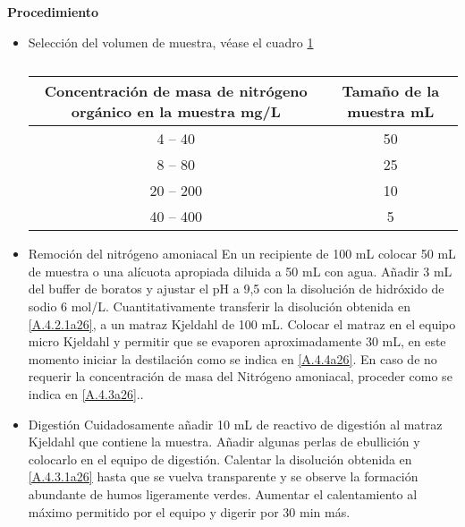 \Large{\textbf{Procedimiento}}
\normalsize

\begin{itemize}
	\item Selección del volumen de muestra, véase el cuadro \ref{tab:A1a26} \label{A.4.1a26}
	\begin{table}[!h]
		\centering
		\caption{}
		\label{tab:A1a26}
		\begin{tabular}{|c|c|}
			\hline
			\rowcolor[HTML]{C0C0C0} 
			Concentración de masa de nitrógeno orgánico en la muestra mg/L & Tamaño de la muestra mL \\ \hline
			4 -- 40                                                        & 50                      \\ \hline
			8 -- 80                                                        & 25                      \\ \hline
			20 -- 200                                                      & 10                      \\ \hline
			40 -- 400                                                      & 5                       \\ \hline
		\end{tabular}
	\end{table}
	\item Remoción del nitrógeno amoniacal\label{A.4.2a26}
	\subitem En un recipiente de 100 mL colocar 50 mL de muestra o una alícuota apropiada diluida a 50 mL con agua. Añadir 3 mL del buffer de boratos y ajustar el pH a 9,5 con la disolución de hidróxido de sodio 6 mol/L.\label{A.4.2.1a26}
	\subitem Cuantitativamente transferir la disolución obtenida en \ref{A.4.2.1a26}, a un matraz Kjeldahl de 100 mL. Colocar el matraz en el equipo micro Kjeldahl y permitir que se evaporen aproximadamente 30 mL, en este momento iniciar la destilación como se indica en \ref{A.4.4a26}.\label{A.4.2.2a26}
	\subitem En caso de no requerir la concentración de masa del Nitrógeno amoniacal, proceder como se indica en \ref{A.4.3a26}.\label{A.4.2.3a26}.
	\item Digestión\label{A.4.3a26}
	\subitem Cuidadosamente añadir 10 mL de reactivo de digestión al matraz Kjeldahl que contiene la muestra. Añadir algunas perlas de ebullición y colocarlo en el equipo de digestión.\label{A.4.3.1a26}
	\subitem Calentar la disolución obtenida en \ref{A.4.3.1a26} hasta que se vuelva transparente y se observe la formación abundante de humos ligeramente verdes.\label{A.4.3.2a26}
	\subitem Aumentar el calentamiento al máximo permitido por el equipo y digerir por 30 min más.\label{A.4.3.3a26}

\end{itemize}
